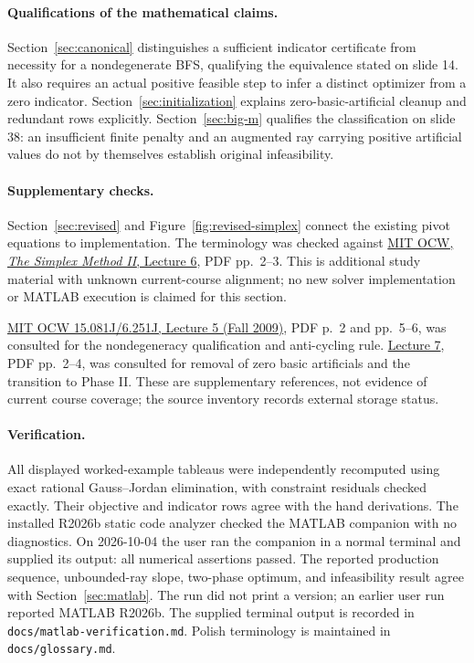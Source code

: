 \documentclass[11pt,a4paper]{article}
\begin{document}
\paragraph{Qualifications of the mathematical claims.}
Section~\ref{sec:canonical} distinguishes a sufficient indicator certificate
from necessity for a nondegenerate BFS, qualifying the equivalence stated on
slide 14. It also requires an actual positive feasible step to infer a distinct
optimizer from a zero indicator. Section~\ref{sec:initialization} explains
zero-basic-artificial cleanup and redundant rows explicitly.
Section~\ref{sec:big-m} qualifies the classification on slide 38:
an insufficient finite penalty and an augmented ray carrying positive artificial
values do not by themselves establish original infeasibility.

\paragraph{Supplementary checks.}
Section~\ref{sec:revised} and Figure~\ref{fig:revised-simplex} connect the
existing pivot equations to implementation. The terminology was checked against
\href{https://ocw.mit.edu/courses/6-251j-introduction-to-mathematical-programming-fall-2009/2ef2f1dd7045b5f29e5faea299fb0798_MIT6_251JF09_lec06.pdf}{MIT OCW,
  \emph{The Simplex Method II}, Lecture 6}, PDF pp.~2--3.
This is additional study material with unknown current-course alignment;
no new solver implementation or MATLAB execution is claimed for this section.

\href{https://ocw.mit.edu/courses/6-251j-introduction-to-mathematical-programming-fall-2009/4fdf1a06497288c24593f7eedef7576e_MIT6_251JF09_lec05.pdf}{MIT OCW 15.081J/6.251J, Lecture 5 (Fall 2009)},
PDF p.~2 and pp.~5--6, was consulted for the nondegeneracy qualification and
anti-cycling rule.
\href{https://ocw.mit.edu/courses/6-251j-introduction-to-mathematical-programming-fall-2009/12b1c7e885991696c294953b2497739c_MIT6_251JF09_lec07.pdf}{Lecture 7},
PDF pp.~2--4, was consulted for removal of zero basic artificials and the
transition to Phase II. These are supplementary references, not evidence of
current course coverage; the source inventory records external storage status.

\paragraph{Verification.}
All displayed worked-example tableaus were independently recomputed using
exact rational Gauss--Jordan elimination, with constraint residuals checked
exactly. Their objective and indicator rows agree with the hand derivations.
The installed R2026b static code analyzer checked the MATLAB companion with
no diagnostics. On 2026-10-04 the user ran the companion in a normal terminal
and supplied its output: all numerical assertions passed. The reported production
sequence, unbounded-ray slope, two-phase optimum, and infeasibility result agree
with Section~\ref{sec:matlab}. The run did not print a version; an earlier
user run reported MATLAB R2026b. The supplied terminal output is recorded in
\texttt{docs/matlab-verification.md}.
Polish terminology is maintained in \texttt{docs/glossary.md}.
\end{document}
